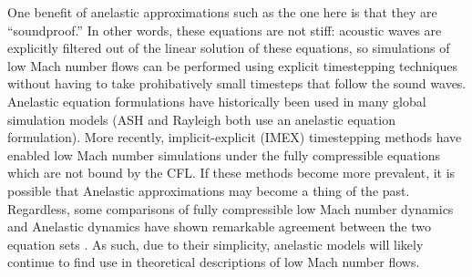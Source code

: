 One benefit of anelastic approximations such as the one here is that they are ``soundproof.''
In other words, these equations are not stiff: acoustic waves are explicitly filtered out of the linear solution of these equations, so simulations of low Mach number flows can be performed using explicit timestepping techniques without having to take prohibatively small timesteps that follow the sound waves.
Anelastic equation formulations have historically been used in many global simulation models (ASH and Rayleigh both use an anelastic equation formulation).
More recently, implicit-explicit (IMEX) timestepping methods have enabled low Mach number simulations under the fully compressible equations which are not bound by the CFL.
If these methods become more prevalent, it is possible that Anelastic approximations may become a thing of the past.
Regardless, some comparisons of fully compressible low Mach number dynamics and Anelastic dynamics have shown remarkable agreement between the two equation sets \citep[see e.g.,][and chapter \ref{ch:alb19}]{lecoanet&all2014, andersLB2019}.
As such, due to their simplicity, anelastic models will likely continue to find use in theoretical descriptions of low Mach number flows.


